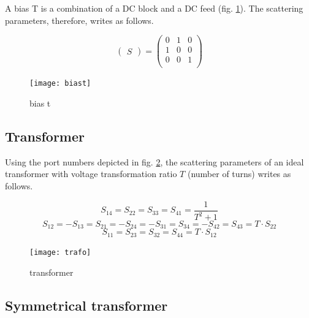 \documentclass[10pt]{report}
\begin{document}
A bias T is a combination of a DC block and a DC feed
(fig. \ref{fig:biast}).  The scattering parameters, therefore, writes
as follows.

\begin{equation}
\begin{pmatrix}
S
\end{pmatrix}
=
\begin{pmatrix}
0 & 1 & 0\\
1 & 0 & 0\\
0 & 0 & 1\\
\end{pmatrix}
\end{equation}

\begin{figure}[ht]
\begin{center}
\texttt{[image: biast]}
\end{center}
\caption{bias t}
\label{fig:biast}
\end{figure}
\FloatBarrier

\subsection{Transformer}

Using the port numbers depicted in fig. \ref{fig:trafo}, the
scattering parameters of an ideal transformer with voltage
transformation ratio $T$ (number of turns) writes as follows.

\begin{equation}
S_{14} = S_{22} = S_{33} = S_{41} = \frac{1}{T^2+1}
\end{equation}
\begin{equation}
S_{12} = -S_{13} = S_{21} = -S_{24} = -S_{31} = S_{34} = -S_{42} = S_{43} = T\cdot S_{22}
\end{equation}
\begin{equation}
S_{11} = S_{23} = S_{32} = S_{44} = T\cdot S_{12}
\end{equation}

\begin{figure}[ht]
\begin{center}
\texttt{[image: trafo]}
\end{center}
\caption{transformer}
\label{fig:trafo}
\end{figure}
\FloatBarrier

\subsection{Symmetrical transformer}
\end{document}
